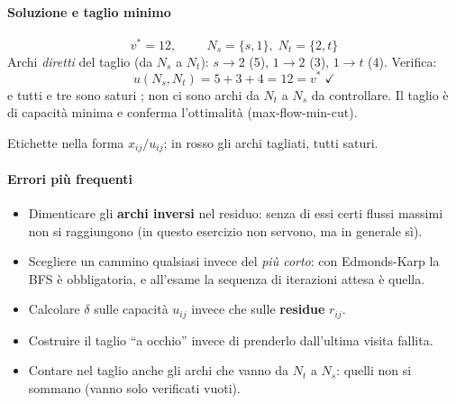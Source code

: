 \documentclass[12pt]{extarticle} %
\begin{document}
\paragraph{Soluzione e taglio minimo}
\[
v^* = 12, \hspace{1cm} N_s = \{s,1\},\; N_t = \{2,t\}
\]
Archi \emph{diretti} del taglio (da $N_s$ a $N_t$): $s\to 2$ (5), $1\to 2$ (3), $1\to t$ (4). Verifica:
\[
u(N_s,N_t) = 5 + 3 + 4 = 12 = v^* \;\checkmark
\]
e tutti e tre sono saturi \checkmark; non ci sono archi da $N_t$ a $N_s$ da controllare. Il taglio è di capacità minima e conferma l'ottimalità (max-flow-min-cut).
\begin{center}
\end{center}
\noindent Etichette nella forma $x_{ij}/u_{ij}$; in rosso gli archi tagliati, tutti saturi.

\paragraph{Errori più frequenti}
\begin{itemize}
    \item Dimenticare gli \textbf{archi inversi} nel residuo: senza di essi certi flussi massimi non si raggiungono (in questo esercizio non servono, ma in generale sì).
    \item Scegliere un cammino qualsiasi invece del \emph{più corto}: con Edmonds-Karp la BFS è obbligatoria, e all'esame la sequenza di iterazioni attesa è quella.
    \item Calcolare $\delta$ sulle capacità $u_{ij}$ invece che sulle \textbf{residue} $r_{ij}$.
    \item Costruire il taglio ``a occhio'' invece di prenderlo dall'ultima visita fallita.
    \item Contare nel taglio anche gli archi che vanno da $N_t$ a $N_s$: quelli non si sommano (vanno solo verificati vuoti).
\end{itemize}
\end{document}
